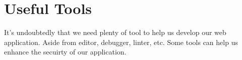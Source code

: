 \documentclass[conference]{IEEEtran}
\begin{document}
%
%
%
%


%   
\section{Useful Tools}
It's undoubtedly that we need plenty of tool to help us
develop our web application. Aside from editor, debugger,
linter, etc. Some tools can help us enhance the secuirty of our application.
\end{document}
